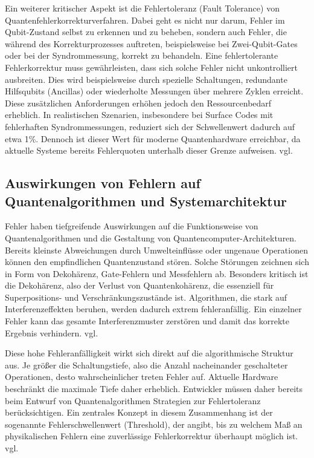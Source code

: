 Ein weiterer kritischer Aspekt ist die Fehlertoleranz (Fault Tolerance) von Quantenfehlerkorrekturverfahren. Dabei geht es nicht nur darum, Fehler im Qubit-Zustand selbst zu erkennen und zu beheben, sondern auch Fehler, die während des Korrekturprozesses auftreten, beispielsweise bei Zwei-Qubit-Gates oder bei der Syndrommessung, korrekt zu behandeln. Eine fehlertolerante Fehlerkorrektur muss gewährleisten, dass sich solche Fehler nicht unkontrolliert ausbreiten. Dies wird beispielsweise durch spezielle Schaltungen, redundante Hilfsqubits (Ancillas) oder wiederholte Messungen über mehrere Zyklen erreicht. Diese zusätzlichen Anforderungen erhöhen jedoch den Ressourcenbedarf erheblich. In realistischen Szenarien, insbesondere bei Surface Codes mit fehlerhaften Syndrommessungen, reduziert sich der Schwellenwert dadurch auf etwa 1\%. Dennoch ist dieser Wert für moderne Quantenhardware erreichbar, da aktuelle Systeme bereits Fehlerquoten unterhalb dieser Grenze aufweisen. vgl. \cite[Seite 13-15]{roffe_quantum_2019} 

\subsection{Auswirkungen von Fehlern auf Quantenalgorithmen und Systemarchitektur}
Fehler haben tiefgreifende Auswirkungen auf die Funktionsweise von Quantenalgorithmen und die Gestaltung von Quantencomputer-Architekturen. Bereits kleinste Abweichungen durch Umwelteinflüsse oder ungenaue Operationen können den empfindlichen Quantenzustand stören. Solche Störungen zeichnen sich in Form von Dekohärenz, Gate-Fehlern und Messfehlern ab. Besonders kritisch ist die Dekohärenz, also der Verlust von Quantenkohärenz, die essenziell für Superpositions- und Verschränkungszustände ist. Algorithmen, die stark auf Interferenzeffekten beruhen, werden dadurch extrem fehleranfällig. Ein einzelner Fehler kann das gesamte Interferenzmuster zerstören und damit das korrekte Ergebnis verhindern. vgl. \cite[Seite 381-385]{nielsen_quantum_2010}\medskip

Diese hohe Fehleranfälligkeit wirkt sich direkt auf die algorithmische Struktur aus. Je größer die Schaltungstiefe, also die Anzahl nacheinander geschalteter Operationen, desto wahrscheinlicher treten Fehler auf. Aktuelle Hardware beschränkt die maximale Tiefe daher erheblich. Entwickler müssen daher bereits beim Entwurf von Quantenalgorithmen Strategien zur Fehlertoleranz berücksichtigen. Ein zentrales Konzept in diesem Zusammenhang ist der sogenannte Fehlerschwellenwert (Threshold), der angibt, bis zu welchem Maß an physikalischen Fehlern eine zuverlässige Fehlerkorrektur überhaupt möglich ist. vgl. \cite[Seite 293-308]{rieffelQuantumComputingGentle2011a}\medskip

